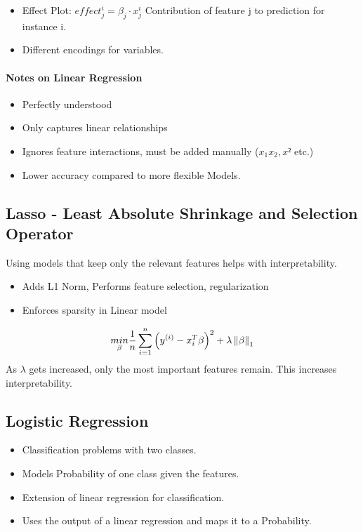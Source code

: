 \begin{itemize}
	\item Effect Plot: $effect_j^i = \beta_j \cdot x_j^i$ Contribution of feature j to prediction for instance i.
	\item Different encodings for variables.
\end{itemize}


\paragraph{Notes on Linear Regression}
\begin{itemize}
	\item Perfectly understood
	\item Only captures linear relationships
	\item Ignores feature interactions, must be added manually ($x_1x_2, x²$ etc.)
	\item Lower accuracy compared to more flexible Models.
\end{itemize}


\subsection{Lasso - Least Absolute Shrinkage and Selection Operator}
Using models that keep only the relevant features helps with interpretability.
\begin{itemize}
	\item Adds L1 Norm, Performs feature selection, regularization
	\item Enforces sparsity in Linear model
\end{itemize}
\begin{equation}
	\underset{\beta}{min} \frac{1}{n}\sum_{i=1}^n\left (y^{(i)}-x_i^T \beta \right)^{2} + \lambda \left\lVert\beta\right\rVert _1
	\label{eq:LASSO-L1}
\end{equation}
As $\lambda$ gets increased, only the most important features remain. This increases interpretability.



\subsection{Logistic Regression}
\begin{itemize}
	\item Classification problems with two classes.
	\item Models Probability of one class given the features.
	\item Extension of linear regression for classification.
	\item Uses the output of a linear regression and maps it to a Probability.
\end{itemize}
